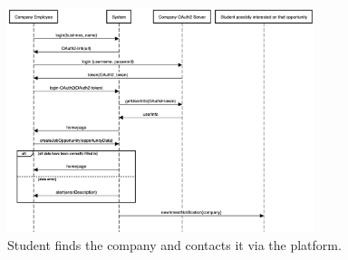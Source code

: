     \begin{figure}[H]
        \centering
        \includegraphics[width=0.8\textwidth]{RASD/Assets/SequenceDiagrams/4-company-publish-and-adv.png}
        \caption{Student finds the company and contacts it via the platform.}
        \label{fig:Student search and contact the company}
    \end{figure}


